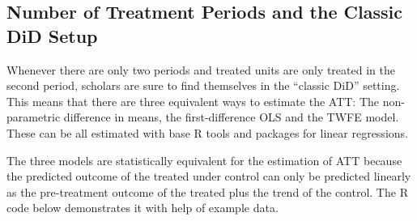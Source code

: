 \documentclass[hidelinks]{article}\usepackage[]{graphicx}\usepackage[]{xcolor}
\begin{document}
\subsection{Number of Treatment Periods and the Classic DiD Setup}

Whenever there are only two periods and treated units are only treated in the second period, scholars are sure to find themselves in the ``classic DiD'' setting.
This means that there are three equivalent ways to estimate the ATT: The non-parametric difference in means, the first-difference OLS and the TWFE model. These can be all estimated with base R tools and packages for linear regressions.

The three models are statistically equivalent for the estimation of ATT because the predicted outcome of the treated under control can only be predicted linearly as the pre-treatment outcome of the treated plus the trend of the control. The R code below demonstrates it with help of example data.
\end{document}
